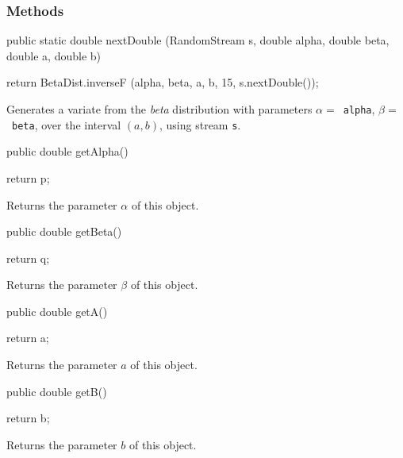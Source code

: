 \subsubsection* {Methods}
\begin{code}

   public static double nextDouble (RandomStream s, double alpha,
                                    double beta, double a, double b)\begin{hide} {
      return BetaDist.inverseF (alpha, beta, a, b, 15, s.nextDouble());
   }\end{hide}
\end{code}
\begin{tabb} Generates a variate from the {\em beta\/} distribution with
 parameters $\alpha = $~\texttt{alpha}, $\beta = $~\texttt{beta}, over the
 interval $(a, b)$, using stream \texttt{s}.
\end{tabb}
\begin{code}

   public double getAlpha()\begin{hide} {
      return p;
   }\end{hide}
\end{code}
  \begin{tabb} Returns the parameter $\alpha$ of this object.
  \end{tabb}
\begin{code}

   public double getBeta()\begin{hide} {
      return q;
   }\end{hide}
\end{code}
  \begin{tabb} Returns the parameter $\beta$ of this object.
  \end{tabb}
\begin{code}

   public double getA()\begin{hide} {
      return a;
   }\end{hide}
\end{code}
  \begin{tabb} Returns the parameter $a$ of this object.
  \end{tabb}
\begin{code}

   public double getB()\begin{hide} {
      return b;
   }\end{hide}
\end{code}
\begin{tabb} Returns the parameter $b$ of this object.
\end{tabb}
\begin{code}\begin{hide}

   protected void setParams (double alpha, double beta, double aa, double bb) {
      if (alpha <= 0.0)
         throw new IllegalArgumentException ("alpha <= 0");
      if (beta <= 0.0)
         throw new IllegalArgumentException ("beta <= 0");
      if (aa >= bb)
         throw new IllegalArgumentException ("a >= b");
      p = alpha;
      q = beta;
      a = aa;
      b = bb;
   }
}\end{hide}
\end{code}
